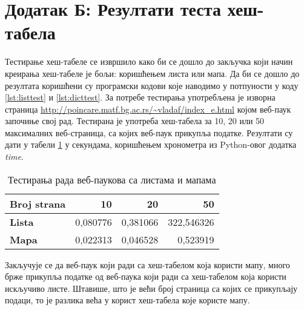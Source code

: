 \section{Додатак Б: Резултати теста хеш-табела}\label{sec:dodatakb}

Тестирање хеш-табеле се извршило како би се дошло до закључка који начин
креирања хеш-табеле је бољи: коришћењем листа или мапа. Да би се дошло до
резултата коришћени су програмски кодови које наводимо у потпуности у коду \ref{lst:listtest} и \ref{lst:dicttest}.
За потребе тестирања употребљена је изворна страница \url{http://poincare.matf.bg.ac.rs/~vladaf/index_e.html}
којом веб-паук започиње свој рад.
Тестирана је употреба хеш-табела за 10, 20 или 50 максималних
веб-страница, са којих веб-паук прикупља податке. Резултати су дати у табели \ref{tabele:list-dict}
у секундама, коришћењем хронометра из Python-овог додатка \emph{time}.

\lstset{numbers=left}


\lstset{numbers=left}


\begin{table}[h]
\centering
\begin{tabular}{|l|r|r|r|} \hline
\textbf{Broj strana} & 10 & 20 & 50\\ \hline
\textbf{Lista} & 0,080776 & 0,381066 & 322,546326\\ \hline
\textbf{Mapa} & 0,022313 & 0,046528 & 0,523919\\ \hline
\end{tabular}
\caption{Тестирања рада веб-паукова са листама и мапама}
\label{tabele:list-dict}
\end{table}

Закључује се да веб-паук који ради са хеш-табелом која користи мапу, много брже прикупља
податке од веб-паука који ради са хеш-табелом која користи искључиво листе. Штавише, што
је већи број страница са којих се прикупљају подаци, то је разлика већа у корист хеш-табела
које користе мапу.
